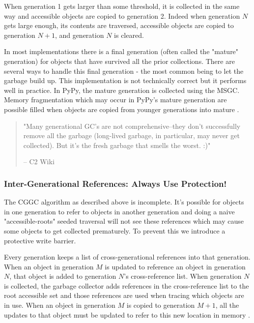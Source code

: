\documentclass{article}
\begin{document}
When generation 1 gets larger than some threshold, it is collected in the same way and accessible objects are copied to generation 2.  Indeed when generation $N$ gets large enough, its contents are traversed, accessible objects are copied to generation $N+1$, and generation $N$ is cleared.

In most implementations there is a final generation (often called the "mature" generation) for objects that have survived all the prior collections.  There are several ways to handle this final generation - the most common being to let the garbage build up.  This implementation is not technically correct but it performs well in practice.  In PyPy, the mature generation is collected using the MSGC.  Memory fragmentation which may occur in PyPy's mature generation are possible filled when objects are copied from younger generations into mature \cite{pypy-doc}.  

\begin{quotation}
"Many generational GC's are not comprehensive--they don't successfully remove all the garbage (long-lived garbage, in particular, may never get collected). But it's the fresh garbage that smells the worst. :)"

 -- C2 Wiki\cite{C2}
\end{quotation}

\subsubsection{Inter-Generational References: Always Use Protection!}

The CGGC algorithm as described above is incomplete.  It's possible for objects in one generation to refer to objects in another generation and doing a naive "accessible-roots" seeded traversal will not see these references which may cause some objects to get collected prematurely.  To prevent this we introduce a protective write barrier.  

Every generation keeps a list of cross-generational references into that generation.  When an object in generation $M$ is updated to reference an object in generation $N$, that object is added to generation $N$'s cross-reference list.  When generation $N$ is collected, the garbage collector adds references in the cross-reference list to the root accessible set and those references are used when tracing which objects are in use.  When an object in generation $M$ is copied to generation $M + 1$, all the updates to that object must be updated to refer to this new location in memory \cite{GC-continuum}.  
\end{document}
